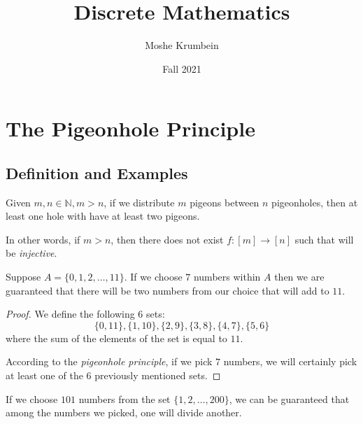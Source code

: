\documentclass[00_complete]{subfiles}
\title{Discrete Mathematics}
\author{Moshe Krumbein}
\date{Fall 2021}
\begin{document}

\section{The Pigeonhole Principle}
\subsection{Definition and Examples}
\begin{definition}
    Given $m, n \in \mathbb{N}, m>n$, if we distribute $m$ pigeons between
    $n$ pigeonholes, then at least one hole with have at least two pigeons.

    In other words, if $m>n$, then there does not exist $f: [m] \to [n]$ such that
    will be \emph{injective}.
\end{definition}

\begin{claim}
    Suppose $A =\{0,1,2,\dots,11\}$. If we choose $7$ numbers within $A$ then
    we are guaranteed that there will be two numbers from our choice that will
    add to $11$.
\end{claim}

\begin{proof}
    We define the following $6$ sets:
    $$\{0,11\},\{1,10\}, \{2,9\}, \{3,8\}, \{4,7\}, \{5,6\}$$
    where the sum of the elements of the set is equal to $11$.

    According to the \emph{pigeonhole principle}, if we pick $7$ numbers, we
    will certainly pick at least one of the $6$ previously mentioned sets.
\end{proof}

\begin{claim}
    If we choose $101$ numbers from the set $\{1,2,\dots,200\}$, we can be
    guaranteed that among the numbers we picked, one will divide
    another.
\end{claim}
\end{document}
